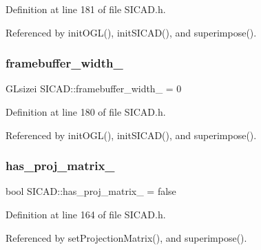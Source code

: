 Definition at line 181 of file S\+I\+C\+A\+D.\+h.



Referenced by init\+O\+G\+L(), init\+S\+I\+C\+A\+D(), and superimpose().

\mbox{\label{classSICAD_a08c86b826a1784b132bac3f0792fc604}} 
\subsubsection{\texorpdfstring{framebuffer\+\_\+width\+\_\+}{framebuffer\_width\_}}
{\footnotesize\ttfamily G\+Lsizei S\+I\+C\+A\+D\+::framebuffer\+\_\+width\+\_\+ = 0\hspace{0.3cm}{\ttfamily [private]}}



Definition at line 180 of file S\+I\+C\+A\+D.\+h.



Referenced by init\+O\+G\+L(), init\+S\+I\+C\+A\+D(), and superimpose().

\mbox{\label{classSICAD_a0eb57d114f3f6b50be13bd882552b2f7}} 
\subsubsection{\texorpdfstring{has\+\_\+proj\+\_\+matrix\+\_\+}{has\_proj\_matrix\_}}
{\footnotesize\ttfamily bool S\+I\+C\+A\+D\+::has\+\_\+proj\+\_\+matrix\+\_\+ = false\hspace{0.3cm}{\ttfamily [private]}}



Definition at line 164 of file S\+I\+C\+A\+D.\+h.



Referenced by set\+Projection\+Matrix(), and superimpose().

\mbox{\label{classSICAD_a093da94bc84a46d08f71051c4d88c176}} 
